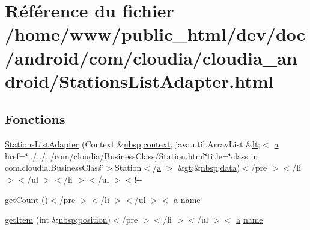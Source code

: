 \hypertarget{_stations_list_adapter_8html}{\section{Référence du fichier /home/www/public\-\_\-html/dev/doc/android/com/cloudia/cloudia\-\_\-android/\-Stations\-List\-Adapter.html}
\label{_stations_list_adapter_8html}
}
\subsection*{Fonctions}
\begin{DoxyCompactItemize}
\item 
\hyperlink{_stations_list_adapter_8html_a165b7f09358fcf241aca1fbfe9a78228}{Stations\-List\-Adapter} (Context \&\hyperlink{_tools_8html_aef915316f784c9063d942974538301a6}{nbsp};\hyperlink{_stations_list_adapter_8html_a261f9f58ccbeaa962c4e675e4212c9cc}{context}, java.\-util.\-Array\-List \&\hyperlink{overview-tree_8html_aac3322e12d911341c3d470b46b2d80f4}{lt};$<$ \hyperlink{style_8css_a5e8981582017bb8b84c21f148345d1f7}{a} href=\char`\"{}../../../com/cloudia/Business\-Class/Station.\-html\char`\"{}title=\char`\"{}class in com.\-cloudia.\-Business\-Class\char`\"{}$>$Station$<$/\hyperlink{style_8css_a5e8981582017bb8b84c21f148345d1f7}{a} $>$ \&\hyperlink{overview-tree_8html_a1bb4447113f0bd7bf49e2b3dee2e065d}{gt};\&\hyperlink{_tools_8html_aef915316f784c9063d942974538301a6}{nbsp};\hyperlink{_show_all_list_adapter_8html_a511ae0b1c13f95e5f08f1a0dd3da3d93}{data})$<$/pre $>$$<$/li $>$$<$/ul $>$$<$/li $>$$<$/ul $>$$<$!-\/-\/
\item 
\hyperlink{_stations_list_adapter_8html_a191788ed350b4e78a3d5dbbecc391f4b}{get\-Count} ()$<$/pre $>$$<$/li $>$$<$/ul $>$$<$ \hyperlink{style_8css_a5e8981582017bb8b84c21f148345d1f7}{a} \hyperlink{_cloudia_d_b_8html_ab74e6bf80237ddc4109968cedc58c151}{name}
\item 
\hyperlink{_stations_list_adapter_8html_acf501ac8c326886f176c7537b25b50c2}{get\-Item} (int \&\hyperlink{_tools_8html_aef915316f784c9063d942974538301a6}{nbsp};\hyperlink{_stations_list_adapter_8html_a7130b1618285588513fd1ff97884b9d9}{position})$<$/pre $>$$<$/li $>$$<$/ul $>$$<$ \hyperlink{style_8css_a5e8981582017bb8b84c21f148345d1f7}{a} \hyperlink{_cloudia_d_b_8html_ab74e6bf80237ddc4109968cedc58c151}{name}
\item 
$$
\end{DoxyCompactItemize}
